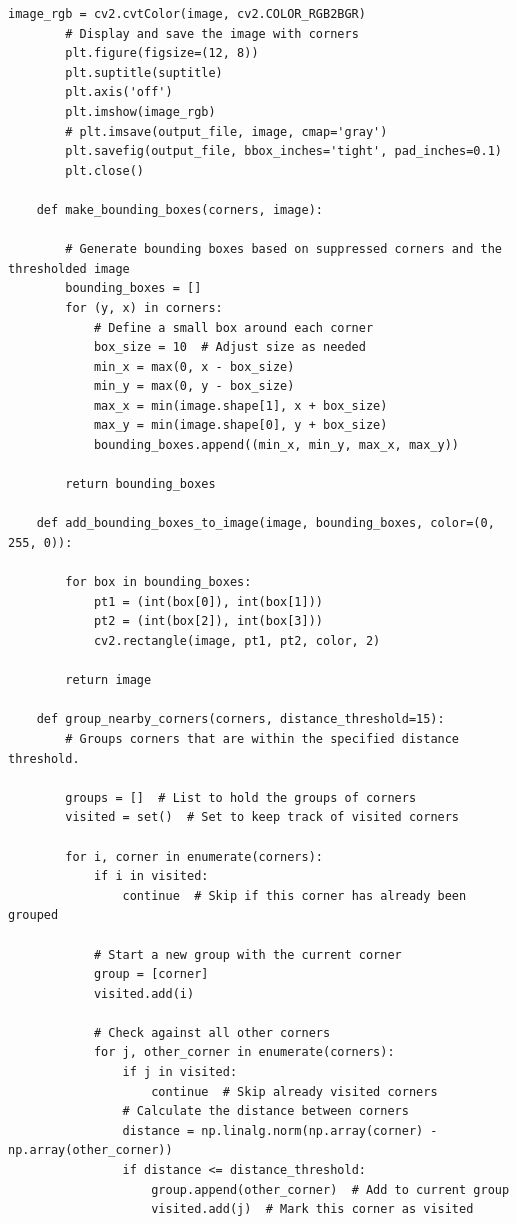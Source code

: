 \documentclass[11pt, conference, letterpaper]{IEEEtran}
\begin{document}
\begin{lstlisting}[style=python, caption={\texttt{plot\_utils.py}}, label={lst:putils}]
        image_rgb = cv2.cvtColor(image, cv2.COLOR_RGB2BGR)
        # Display and save the image with corners
        plt.figure(figsize=(12, 8))
        plt.suptitle(suptitle)
        plt.axis('off')
        plt.imshow(image_rgb)
        # plt.imsave(output_file, image, cmap='gray')
        plt.savefig(output_file, bbox_inches='tight', pad_inches=0.1)
        plt.close() 
            
    def make_bounding_boxes(corners, image):
    
        # Generate bounding boxes based on suppressed corners and the thresholded image
        bounding_boxes = []
        for (y, x) in corners:
            # Define a small box around each corner
            box_size = 10  # Adjust size as needed
            min_x = max(0, x - box_size)
            min_y = max(0, y - box_size)
            max_x = min(image.shape[1], x + box_size)
            max_y = min(image.shape[0], y + box_size)
            bounding_boxes.append((min_x, min_y, max_x, max_y))
    
        return bounding_boxes
    
    def add_bounding_boxes_to_image(image, bounding_boxes, color=(0, 255, 0)):
        
        for box in bounding_boxes:
            pt1 = (int(box[0]), int(box[1]))
            pt2 = (int(box[2]), int(box[3]))
            cv2.rectangle(image, pt1, pt2, color, 2)
            
        return image
    
    def group_nearby_corners(corners, distance_threshold=15):
        # Groups corners that are within the specified distance threshold.
    
        groups = []  # List to hold the groups of corners
        visited = set()  # Set to keep track of visited corners
        
        for i, corner in enumerate(corners):
            if i in visited:
                continue  # Skip if this corner has already been grouped
            
            # Start a new group with the current corner
            group = [corner]
            visited.add(i)
            
            # Check against all other corners
            for j, other_corner in enumerate(corners):
                if j in visited:
                    continue  # Skip already visited corners
                # Calculate the distance between corners
                distance = np.linalg.norm(np.array(corner) - np.array(other_corner))
                if distance <= distance_threshold:
                    group.append(other_corner)  # Add to current group
                    visited.add(j)  # Mark this corner as visited
            

\end{lstlisting}
\end{document}
